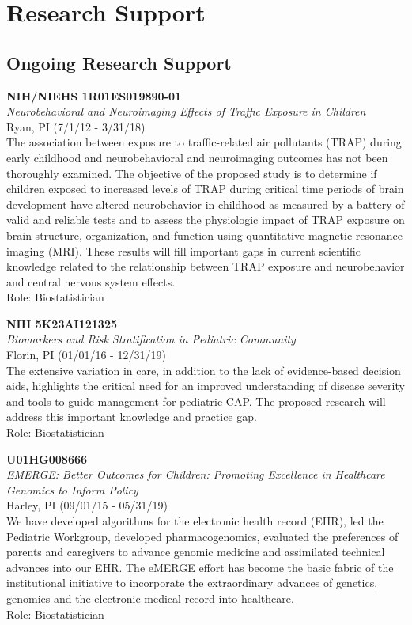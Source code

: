 \documentclass{nihbiosketch}
\begin{document}

\section{Research Support}

\subsection*{Ongoing Research Support}

\bigskip

\textbf{NIH/NIEHS 1R01ES019890-01}\\
\emph{Neurobehavioral and Neuroimaging Effects of Traffic Exposure in
	Children}\\
Ryan, PI (7/1/12 - 3/31/18)\\
The association between exposure to traffic-related air pollutants
(TRAP) during early childhood and neurobehavioral and neuroimaging
outcomes has not been thoroughly examined. The objective of the proposed
study is to determine if children exposed to increased levels of TRAP
during critical time periods of brain development have altered
neurobehavior in childhood as measured by a battery of valid and
reliable tests and to assess the physiologic impact of TRAP exposure on
brain structure, organization, and function using quantitative magnetic
resonance imaging (MRI). These results will fill important gaps in
current scientific knowledge related to the relationship between TRAP
exposure and neurobehavior and central nervous system effects.\\
Role: Biostatistician

\bigskip

\textbf{NIH 5K23AI121325}\\
\emph{Biomarkers and Risk Stratification in Pediatric Community}\\
Florin, PI (01/01/16 - 12/31/19)\\
The extensive variation in care, in addition to the lack of
evidence-based decision aids, highlights the critical need for an
improved understanding of disease severity and tools to guide management
for pediatric CAP. The proposed research will address this important
knowledge and practice gap.\\
Role: Biostatistician

\bigskip

\textbf{U01HG008666}\\
\emph{EMERGE: Better Outcomes for Children: Promoting Excellence in
	Healthcare Genomics to Inform Policy}\\
Harley, PI (09/01/15 - 05/31/19)\\
We have developed algorithms for the electronic health record (EHR), led
the Pediatric Workgroup, developed pharmacogenomics, evaluated the
preferences of parents and caregivers to advance genomic medicine and
assimilated technical advances into our EHR. The eMERGE effort has
become the basic fabric of the institutional initiative to incorporate
the extraordinary advances of genetics, genomics and the electronic
medical record into healthcare.\\
Role: Biostatistician
\end{document}
